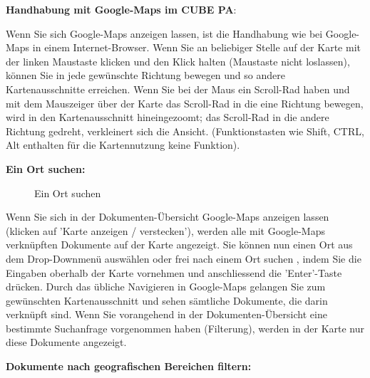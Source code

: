 \textbf{Handhabung mit Google-Maps im CUBE PA}:

Wenn Sie sich Google-Maps anzeigen lassen, ist die Handhabung wie bei Google-Maps in einem Internet-Browser. Wenn Sie an beliebiger Stelle auf der Karte mit der linken Maustaste klicken und den Klick halten (Maustaste nicht loslassen), können Sie in jede gewünschte Richtung bewegen und so andere Kartenausschnitte erreichen. Wenn Sie bei der Maus ein Scroll-Rad haben und mit dem Mauszeiger über der Karte das Scroll-Rad in die eine Richtung bewegen, wird in den Kartenausschnitt hineingezoomt; das Scroll-Rad in die andere Richtung gedreht, verkleinert sich die Ansicht. (Funktionstasten wie Shift, CTRL, Alt enthalten für die Kartennutzung keine Funktion).

\vspace{\baselineskip}

\textbf{Ein Ort suchen:} 

\begin{figure}[H]
\caption{Ein Ort suchen}
\end{figure}

Wenn Sie sich in der Dokumenten-Übersicht Google-Maps anzeigen lassen (klicken auf 'Karte anzeigen / verstecken'), werden alle mit Google-Maps verknüpften Dokumente auf der Karte angezeigt. Sie können nun einen Ort aus dem Drop-Downmenü auswählen  oder frei nach einem Ort suchen , indem Sie die Eingaben oberhalb der Karte vornehmen  und anschliessend die 'Enter'-Taste drücken. Durch das übliche Navigieren in Google-Maps gelangen Sie zum gewünschten Kartenausschnitt und sehen sämtliche Dokumente, die darin verknüpft sind. Wenn Sie vorangehend in der Dokumenten-Übersicht eine bestimmte Suchanfrage vorgenommen haben (Filterung), werden in der Karte nur diese Dokumente angezeigt. \newline

\pagebreak
\textbf{Dokumente nach geografischen Bereichen filtern:} \\

